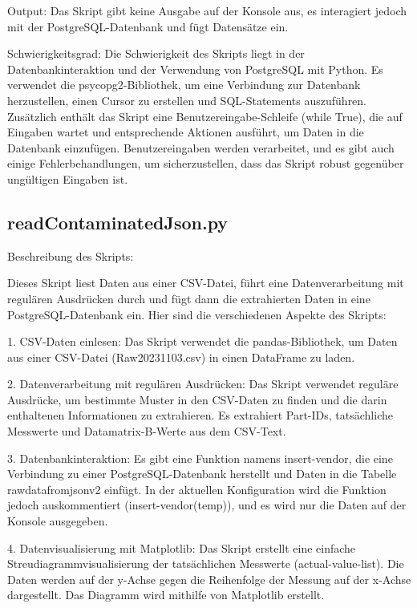 Output:
Das Skript gibt keine Ausgabe auf der Konsole aus, es interagiert jedoch mit der PostgreSQL-Datenbank und fügt Datensätze ein.

Schwierigkeitsgrad:
Die Schwierigkeit des Skripts liegt in der Datenbankinteraktion und der Verwendung von PostgreSQL mit Python. Es verwendet die psycopg2-Bibliothek, um eine Verbindung zur Datenbank herzustellen, einen Cursor zu erstellen und SQL-Statements auszuführen. Zusätzlich enthält das Skript eine Benutzereingabe-Schleife (while True), die auf Eingaben wartet und entsprechende Aktionen ausführt, um Daten in die Datenbank einzufügen. Benutzereingaben werden verarbeitet, und es gibt auch einige Fehlerbehandlungen, um sicherzustellen, dass das Skript robust gegenüber ungültigen Eingaben ist.

\subsection{readContaminatedJson.py}

Beschreibung des Skripts:

Dieses Skript liest Daten aus einer CSV-Datei, führt eine Datenverarbeitung mit regulären Ausdrücken durch und fügt dann die extrahierten Daten in eine PostgreSQL-Datenbank ein. Hier sind die verschiedenen Aspekte des Skripts:

1. CSV-Daten einlesen:
Das Skript verwendet die pandas-Bibliothek, um Daten aus einer CSV-Datei (Raw20231103.csv) in einen DataFrame zu laden.

2. Datenverarbeitung mit regulären Ausdrücken:
Das Skript verwendet reguläre Ausdrücke, um bestimmte Muster in den CSV-Daten zu finden und die darin enthaltenen Informationen zu extrahieren. Es extrahiert Part-IDs, tatsächliche Messwerte und Datamatrix-B-Werte aus dem CSV-Text.

3. Datenbankinteraktion:
Es gibt eine Funktion namens insert-vendor, die eine Verbindung zu einer PostgreSQL-Datenbank herstellt und Daten in die Tabelle rawdatafromjsonv2 einfügt. In der aktuellen Konfiguration wird die Funktion jedoch auskommentiert (insert-vendor(temp)), und es wird nur die Daten auf der Konsole ausgegeben.

4. Datenvisualisierung mit Matplotlib:
Das Skript erstellt eine einfache Streudiagrammvisualisierung der tatsächlichen Messwerte (actual-value-list). Die Daten werden auf der y-Achse gegen die Reihenfolge der Messung auf der x-Achse dargestellt. Das Diagramm wird mithilfe von Matplotlib erstellt.

